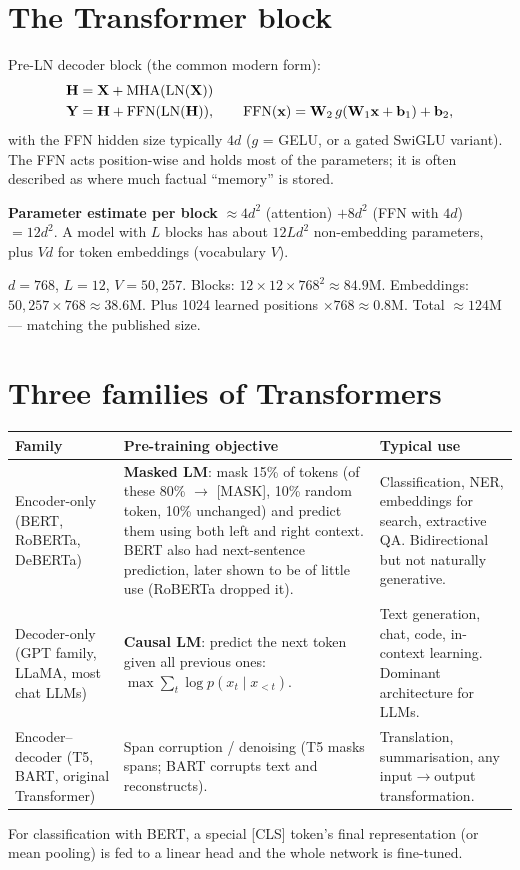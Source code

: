 \section{The Transformer block}
Pre-LN decoder block (the common modern form):
\begin{align*}
\mathbf{H}&=\mathbf{X}+\operatorname{MHA}(\operatorname{LN}(\mathbf{X}))\\
\mathbf{Y}&=\mathbf{H}+\operatorname{FFN}(\operatorname{LN}(\mathbf{H})),\qquad\operatorname{FFN}(\mathbf{x})=\mathbf{W}_2\,g(\mathbf{W}_1\mathbf{x}+\mathbf{b}_1)+\mathbf{b}_2,
\end{align*}
with the FFN hidden size typically $4d$ ($g$ = GELU, or a gated SwiGLU variant). The FFN acts position-wise and holds most of the parameters; it is often described as where much factual ``memory'' is stored.

\textbf{Parameter estimate per block} $\approx4d^2$ (attention) $+8d^2$ (FFN with $4d$) $=12d^2$. A model with $L$ blocks has about $12Ld^2$ non-embedding parameters, plus $Vd$ for token embeddings (vocabulary $V$).

\begin{example}
$d=768$, $L=12$, $V=50{,}257$. Blocks: $12\times12\times768^2\approx84.9$M. Embeddings: $50{,}257\times768\approx38.6$M. Plus 1024 learned positions $\times768\approx0.8$M. Total $\approx124$M --- matching the published size.
\end{example}

\section{Three families of Transformers}
\begin{longtable}{@{}p{}p{}p{}@{}}
\toprule
Family & Pre-training objective & Typical use\\
\midrule
Encoder-only (BERT, RoBERTa, DeBERTa) & \textbf{Masked LM}: mask 15\% of tokens (of these 80\% $\to$ [MASK], 10\% random token, 10\% unchanged) and predict them using both left and right context. BERT also had next-sentence prediction, later shown to be of little use (RoBERTa dropped it). & Classification, NER, embeddings for search, extractive QA. Bidirectional but not naturally generative.\\
Decoder-only (GPT family, LLaMA, most chat LLMs) & \textbf{Causal LM}: predict the next token given all previous ones: $\max\sum_t\log p(x_t\mid x_{<t})$. & Text generation, chat, code, in-context learning. Dominant architecture for LLMs.\\
Encoder--decoder (T5, BART, original Transformer) & Span corruption / denoising (T5 masks spans; BART corrupts text and reconstructs). & Translation, summarisation, any input$\to$output transformation.\\
\bottomrule
\end{longtable}
For classification with BERT, a special [CLS] token's final representation (or mean pooling) is fed to a linear head and the whole network is fine-tuned.

